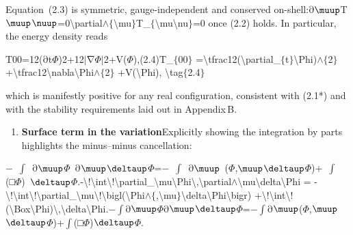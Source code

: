\documentclass{iopjournal}
\begin{document}
Equation~(2.3) is symmetric, gauge-independent and conserved on-shell:$\mathrm{\partial}$$\muup$T$\muup$$\nuup$=0{\textbackslash}partial$\mathrm{\wedge}$$\mathrm{\{}${\textbackslash}mu$\mathrm{\}}$T\_$\mathrm{\{}${\textbackslash}mu{\textbackslash}nu$\mathrm{\}}$=0 once (2.2) holds. In particular, the energy density reads

T00=12($\mathrm{\partial}$t$\Phi$)2+12$\mathrm{\mid }$$\mathrm{\nabla }$$\Phi$$\mathrm{\mid }$2+V($\Phi$),(2.4)T\_$\mathrm{\{}$00$\mathrm{\}}$ ={\textbackslash}tfrac12({\textbackslash}partial\_$\mathrm{\{}$t$\mathrm{\}}${\textbackslash}Phi)$\mathrm{\wedge}$$\mathrm{\{}$2$\mathrm{\}}$ +{\textbackslash}tfrac12{\textbar}{\textbackslash}nabla{\textbackslash}Phi{\textbar}$\mathrm{\wedge}$$\mathrm{\{}$2$\mathrm{\}}$ +V({\textbackslash}Phi), {\textbackslash}tag$\mathrm{\{}$2.4$\mathrm{\}}$

which is manifestly positive for any real configuration, consistent with (2.1*) and with the stability requirements laid out in Appendix B.


\begin{enumerate}
\item  \textbf{Surface term in the variation}Explicitly showing the integration by parts highlights the minus--minus cancellation:
\end{enumerate}

$\mathrm{-}$\ $\mathrm{}$$\mathrm{\int}$\ $\mathrm{}$$\mathrm{\partial}$$\muup$$\Phi$\ $\mathrm{\partial}$$\muup$$\deltaup$$\Phi$=$\mathrm{-}$\ $\mathrm{}$$\mathrm{\int}$\ $\mathrm{}$$\mathrm{\partial}$$\muup$\ $\mathrm{}$($\Phi$,$\muup$$\deltaup$$\Phi$)+\ $\mathrm{}$$\mathrm{\int}$\ $\mathrm{}$(□$\Phi$)\ $\deltaup$$\Phi$.-{\textbackslash}!{\textbackslash}int{\textbackslash}!{\textbackslash}partial\_{\textbackslash}mu{\textbackslash}Phi{\textbackslash},{\textbackslash}partial$\mathrm{\wedge}${\textbackslash}mu{\textbackslash}delta{\textbackslash}Phi = -{\textbackslash}!{\textbackslash}int{\textbackslash}!{\textbackslash}partial\_{\textbackslash}mu{\textbackslash}!{\textbackslash}bigl({\textbackslash}Phi$\mathrm{\wedge}$$\mathrm{\{}$,{\textbackslash}mu$\mathrm{\}}${\textbackslash}delta{\textbackslash}Phi{\textbackslash}bigr) +{\textbackslash}!{\textbackslash}int{\textbackslash}!({\textbackslash}Box{\textbackslash}Phi){\textbackslash},{\textbackslash}delta{\textbackslash}Phi.$\mathrm{-}$$\mathrm{\int}$$\mathrm{\partial}$$\muup${}$\Phi$$\mathrm{\partial}$$\muup$$\deltaup$$\Phi$=$\mathrm{-}$$\mathrm{\int}$$\mathrm{\partial}$$\muup${}($\Phi$,$\muup$$\deltaup$$\Phi$)+$\mathrm{\int}$(□$\Phi$)$\deltaup$$\Phi$.
\end{document}
